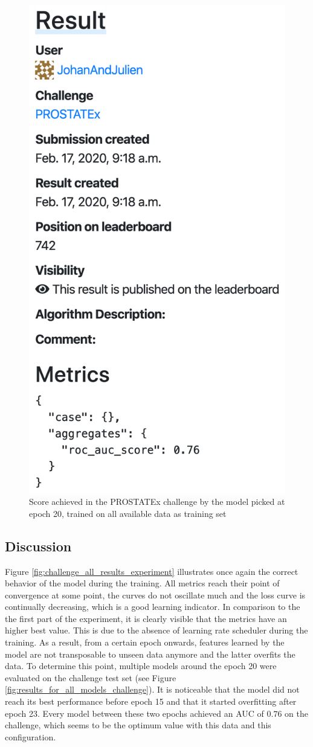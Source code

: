 \begin{figure}[!t]
\centering
\includegraphics[height=1\textwidth, keepaspectratio=true]{./figures/paper_reproduction_results_challenge2.png}
\caption{Score achieved in the PROSTATEx challenge by the model picked at epoch 20, trained on all available data as training set}
\label{fig:paper_reprodution_results_challenge2}
\end{figure}

\clearpage

\subsection{Discussion}
\setlength{\marginparwidth}{3cm}\leavevmode {}Figure \ref{fig:challenge_all_results_experiment} illustrates once again the correct behavior of the model during the training. All metrics reach their point of convergence at some point, the curves do not oscillate much and the loss curve is continually decreasing, which is a good learning indicator. In comparison to the the first part of the experiment, it is clearly visible that the metrics have an higher best value. This is due to the absence of learning rate scheduler during the training. As a result, from a certain epoch onwards, features learned by the model are not transposable to unseen data anymore and the latter overfits the data. To determine this point, multiple models around the epoch 20 were evaluated on the challenge test set (see Figure \ref{fig:results_for_all_models_challenge}). It is noticeable that the model did not reach its best performance before epoch 15 and that it started overfitting after epoch 23. Every model between these two epochs achieved an AUC of $0.76$ on the challenge, which seems to be the optimum value with this data and this configuration.


